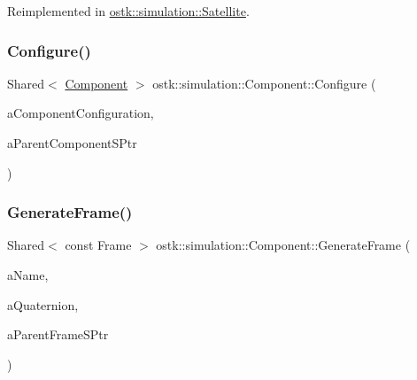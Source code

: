 Reimplemented in \hyperlink{classostk_1_1simulation_1_1_satellite_a9828fe3ec02b8f4d8b2faf8412826f00}{ostk\+::simulation\+::\+Satellite}.

\mbox{\label{classostk_1_1simulation_1_1_component_a635e3685019800ec343ec8474954ff0e}} 
\subsubsection{\texorpdfstring{Configure()}{Configure()}}
{\footnotesize\ttfamily Shared$<$ \hyperlink{classostk_1_1simulation_1_1_component}{Component} $>$ ostk\+::simulation\+::\+Component\+::\+Configure (\begin{DoxyParamCaption}\item[{const \hyperlink{structostk_1_1simulation_1_1_component_configuration}{Component\+Configuration} \&}]{a\+Component\+Configuration,  }\item[{const Shared$<$ \hyperlink{classostk_1_1simulation_1_1_component}{Component} $>$ \&}]{a\+Parent\+Component\+S\+Ptr }\end{DoxyParamCaption})\hspace{0.3cm}{\ttfamily [static]}}

\mbox{\label{classostk_1_1simulation_1_1_component_a9b5f84be02c06a7b6576fcdb00640ede}} 
\subsubsection{\texorpdfstring{Generate\+Frame()}{GenerateFrame()}}
{\footnotesize\ttfamily Shared$<$ const Frame $>$ ostk\+::simulation\+::\+Component\+::\+Generate\+Frame (\begin{DoxyParamCaption}\item[{const String \&}]{a\+Name,  }\item[{const Quaternion \&}]{a\+Quaternion,  }\item[{const Shared$<$ const Frame $>$ \&}]{a\+Parent\+Frame\+S\+Ptr }\end{DoxyParamCaption})\hspace{0.3cm}{\ttfamily [static]}}

